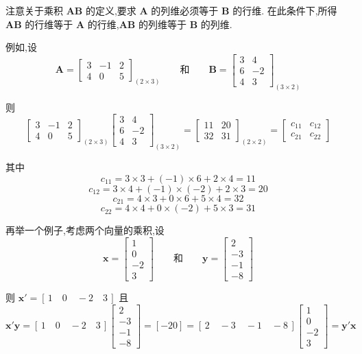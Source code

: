 
注意关于乘积 $\bm{A}\bm{B}$ 的定义,要求 $\bm{A}$ 的列维必须等于 $\bm{B}$ 的行维. 在此条件下,所得 $\bm{A}\bm{B}$ 的行维等于 $\bm{A}$ 的行维,$\bm{A}\bm{B}$ 的列维等于 $\bm{B}$ 的列维.

例如,设
\[
\bm{A} = \begin{bmatrix} 3 & -1 & 2 \\ 4 & 0 & 5 \end{bmatrix}_{(2\times 3)}
\qquad \text{和} \qquad
\bm{B} = \begin{bmatrix} 3 & 4 \\ 6 & -2 \\ 4 & 3 \end{bmatrix}_{(3\times 2)}
\]

则
\[
\begin{bmatrix} 3 & -1 & 2 \\ 4 & 0 & 5 \end{bmatrix}_{(2\times 3)}
\begin{bmatrix} 3 & 4 \\ 6 & -2 \\ 4 & 3 \end{bmatrix}_{(3\times 2)}
= \begin{bmatrix} 11 & 20 \\ 32 & 31 \end{bmatrix}_{(2\times 2)}
= \begin{bmatrix} c_{11} & c_{12} \\ c_{21} & c_{22} \end{bmatrix}
\]

其中
\[
c_{11} = 3 \times 3 + (-1) \times 6 + 2 \times 4 = 11
\]
\[
c_{12} = 3 \times 4 + (-1) \times (-2) + 2 \times 3 = 20
\]
\[
c_{21} = 4 \times 3 + 0 \times 6 + 5 \times 4 = 32
\]
\[
c_{22} = 4 \times 4 + 0 \times (-2) + 5 \times 3 = 31
\]

再举一个例子,考虑两个向量的乘积,设
\[
\bm{x} = \begin{bmatrix} 1 \\ 0 \\ -2 \\ 3 \end{bmatrix}
\qquad \text{和} \qquad
\bm{y} = \begin{bmatrix} 2 \\ -3 \\ -1 \\ -8 \end{bmatrix}
\]

则 $\bm{x}' = [\,1 \quad 0 \quad -2 \quad 3\,]$ 且
\[
\bm{x}'\bm{y} = [\,1 \quad 0 \quad -2 \quad 3\,]
\begin{bmatrix} 2 \\ -3 \\ -1 \\ -8 \end{bmatrix}
= [-20] = [\,2 \quad -3 \quad -1 \quad -8\,]
\begin{bmatrix} 1 \\ 0 \\ -2 \\ 3 \end{bmatrix}
= \bm{y}'\bm{x}
\]

